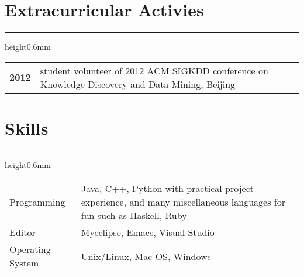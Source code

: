 \documentclass[9pt]{res}
\newcommand*\varhrulefill[1][0.4pt]{\leavevmode\leaders\hrule height#1\hfill\kern0pt}
\begin{document}
\begin{resume}
\section{\large \color{light-gray} Extracurricular Activies}
\noindent\varhrulefill[0.6mm] \vspace{1mm}\\
\begin{tabular}{@{}p{.3in}p{7.1in}}
{\bf 2012} & student volunteer of 2012 ACM SIGKDD conference on Knowledge Discovery and Data Mining, Beijing\\ [.5ex]
\end{tabular}


\section{\large \color{light-gray} Skills} 
\noindent\varhrulefill[0.6mm] \vspace{1mm}\\
\begin{tabular}{@{}p{1.2in}p{6.2in}}
Programming & Java, C++, Python with practical project experience, and many miscellaneous languages for fun such as Haskell, Ruby \\ [.5ex]
Editor & Myeclipse, Emacs, Visual Studio\\ [.5ex]
Operating System & Unix/Linux, Mac OS, Windows\\ [.5ex]
\end{tabular}

\end{resume}
\end{document}
